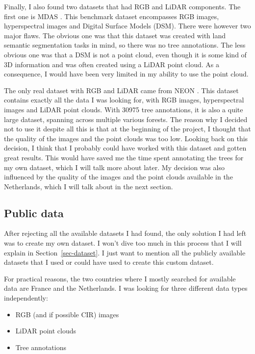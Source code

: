\documentclass[
]{report}
\providecommand{\tightlist}{%
  \setlength{\itemsep}{0pt}\setlength{\parskip}{0pt}}\usepackage{longtable,booktabs,array}
\begin{document}
Finally, I also found two datasets that had RGB and LiDAR components.
The first one is MDAS \autocite{MDAS}. This benchmark dataset
encompasses RGB images, hyperspectral images and Digital Surface Models
(DSM). There were however two major flaws. The obvious one was that this
dataset was created with land semantic segmentation tasks in mind, so
there was no tree annotations. The less obvious one was that a DSM is
not a point cloud, even though it is some kind of 3D information and was
often created using a LiDAR point cloud. As a consequence, I would have
been very limited in my ability to use the point cloud.

The only real dataset with RGB and LiDAR came from NEON
\autocite{NEONdata}. This dataset contains exactly all the data I was
looking for, with RGB images, hyperspectral images and LiDAR point
clouds. With 30975 tree annotations, it is also a quite large dataset,
spanning across multiple various forests. The reason why I decided not
to use it despite all this is that at the beginning of the project, I
thought that the quality of the images and the point clouds was too low.
Looking back on this decision, I think that I probably could have worked
with this dataset and gotten great results. This would have saved me the
time spent annotating the trees for my own dataset, which I will talk
more about later. My decision was also influenced by the quality of the
images and the point clouds available in the Netherlands, which I will
talk about in the next section.

\subsection{Public data}\label{public-data}

After rejecting all the available datasets I had found, the only
solution I had left was to create my own dataset. I won't dive too much
in this process that I will explain in Section~\ref{sec-dataset}. I just
want to mention all the publicly available datasets that I used or could
have used to create this custom dataset.

For practical reasons, the two countries where I mostly searched for
available data are France and the Netherlands. I was looking for three
different data types independently:

\begin{itemize}
\tightlist
\item
  RGB (and if possible CIR) images
\item
  LiDAR point clouds
\item
  Tree annotations
\end{itemize}
\end{document}
